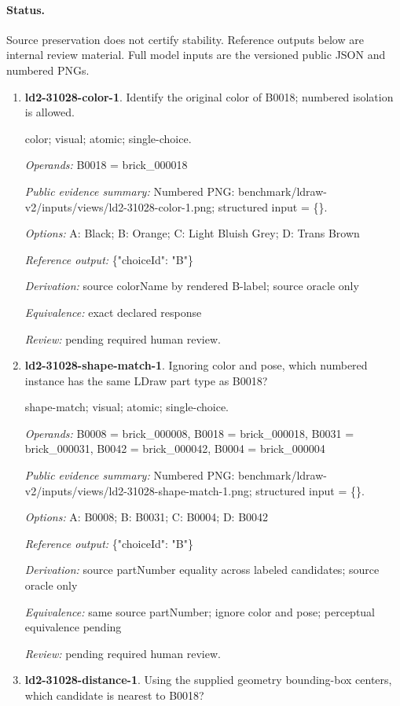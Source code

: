 \paragraph{Status.}Source preservation does not certify stability. Reference outputs below are internal review material. Full model inputs are the versioned public JSON and numbered PNGs.
\begin{enumerate}
\item \textbf{ld2-31028-color-1}. Identify the original color of B0018; numbered isolation is allowed.
\par{\small color; visual; atomic; single-choice.\par\textit{Operands:} B0018 = brick\_000018\par\textit{Public evidence summary:} Numbered PNG: benchmark/ldraw-v2/inputs/views/ld2-31028-color-1.png; structured input = \{\}.\par\textit{Options:} A: Black; B: Orange; C: Light Bluish Grey; D: Trans Brown\par\textit{Reference output:} \{"choiceId": "B"\}\par\textit{Derivation:} source colorName by rendered B-label; source oracle only\par\textit{Equivalence:} exact declared response\par\textit{Review:} pending required human review.}
\item \textbf{ld2-31028-shape-match-1}. Ignoring color and pose, which numbered instance has the same LDraw part type as B0018?
\par{\small shape-match; visual; atomic; single-choice.\par\textit{Operands:} B0008 = brick\_000008, B0018 = brick\_000018, B0031 = brick\_000031, B0042 = brick\_000042, B0004 = brick\_000004\par\textit{Public evidence summary:} Numbered PNG: benchmark/ldraw-v2/inputs/views/ld2-31028-shape-match-1.png; structured input = \{\}.\par\textit{Options:} A: B0008; B: B0031; C: B0004; D: B0042\par\textit{Reference output:} \{"choiceId": "B"\}\par\textit{Derivation:} source partNumber equality across labeled candidates; source oracle only\par\textit{Equivalence:} same source partNumber; ignore color and pose; perceptual equivalence pending\par\textit{Review:} pending required human review.}
\item \textbf{ld2-31028-distance-1}. Using the supplied geometry bounding-box centers, which candidate is nearest to B0018?

\end{enumerate}
